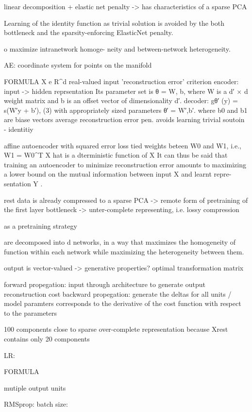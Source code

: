 \documentclass{article} %
\begin{document}
linear decomposition + elastic net penalty -> has characteristics of a
sparse PCA

Learning of the identity function as trivial solution is avoided by
the both bottleneck and the sparsity-enforcing ElasticNet penalty.

o maximize intranetwork homoge- neity and between-network heterogeneity. 


AE:
coordinate system for points on the manifold

FORMULA
X e R^d real-valued input
'reconstruction error' criterion
encoder: input -> hidden reprsentation
Its parameter set is θ = {W, b}, where W is a d′ × d weight matrix and b is an offset vector of dimensionality d′.
decoder: gθ′ (y) = s(W′y + b′), (3)
with appropriately sized parameters θ′ = {W′,b′}.
where b0 and b1 are biase vectors
average reconstruction error
pen. avoids learning trivial soutoin - identitiy


affine autoencoder with squared error loss
tied weights beteen W0 and W1, i.e., W1 = W0^T
X hat is a dterministic function of X
It can thus be said that training an autoencoder to minimize reconstruction error amounts to maximizing a lower bound on the mutual information between input X and learnt repre- sentation Y .

rest data is already compressed to a sparse PCA -> remote form of 
pretraining of the first layer
bottleneck -> unter-complete representing, i.e. lossy compression

as a pretraining strategy

are decomposed into d networks,
in a way that maximizes the homogeneity of
function within each network while maximizing the heterogeneity between them.

output is vector-valued -> generative properties?
optimal transformation matrix 

forward propegation: input through architecture to generate output
reconstruction cost
backward propegation: generate the deltas for all units / model paramters
corresponds to the derivative of the cost function with respect to the parameters



100 components close to sparse over-complete representation because
Xrest contains only 20 components

LR:

FORMULA

mutiple output units


RMSprop:
batch size: 
\end{document}
